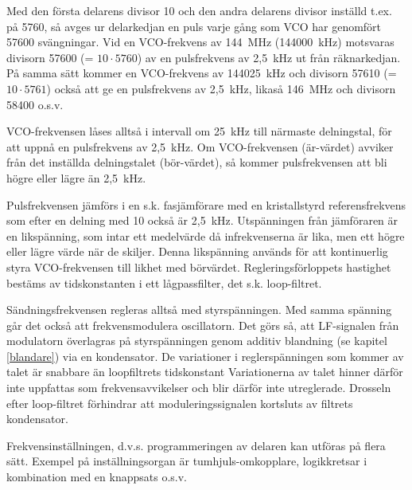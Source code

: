 Med den första delarens divisor 10 och den andra delarens divisor
inställd t.ex. på 5760, så avges ur delarkedjan en puls varje gång som
VCO har genomfört 57600 svängningar. Vid en VCO-frekvens av 144~MHz
(144000~kHz) motsvaras divisorn 57600 (= \(10 \cdot 5760\)) av en
pulsfrekvens av 2,5~kHz ut från räknarkedjan. På samma sätt kommer en
VCO-frekvens av 144025~kHz och divisorn 57610 (= \(10 \cdot 5761\))
också att ge en pulsfrekvens av 2,5~kHz, likaså 146~MHz och divisorn
58400 o.s.v.

VCO-frekvensen låses alltså i intervall om 25~kHz till närmaste
delningstal, för att uppnå en pulsfrekvens av 2,5~kHz. Om
VCO-frekvensen (är-värdet) avviker från det inställda delningstalet
(bör-värdet), så kommer pulsfrekvensen att bli högre eller lägre än
2,5~kHz.

Pulsfrekvensen jämförs i en s.k. fasjämförare med en kristallstyrd
referensfrekvens som efter en delning med 10 också är 2,5~kHz.
Utspänningen från jämföraren är en likspänning, som intar ett
medelvärde då infrekvenserna är lika, men ett högre eller lägre värde
när de skiljer. Denna likspänning används för att kontinuerlig styra
VCO-frekvensen till likhet med börvärdet. Regleringsförloppets
hastighet bestäms av tidskonstanten i ett lågpassfilter, det
s.k. loop-filtret.

Sändningsfrekvensen regleras alltså med styrspänningen. Med samma
spänning går det också att frekvensmodulera oscillatorn.  Det görs så,
att LF-signalen från modulatorn överlagras på styrspänningen genom
additiv blandning (se kapitel \ref{blandare}) via en kondensator. De
variationer i reglerspänningen som kommer av talet är snabbare än
loopfiltrets tidskonstant Variationerna av talet hinner därför inte
uppfattas som frekvensavvikelser och blir därför inte utreglerade.
Drosseln efter loop-filtret förhindrar att moduleringssignalen
kortsluts av filtrets kondensator.

Frekvensinställningen, d.v.s. programmeringen av delaren kan utföras
på flera sätt. Exempel på inställningsorgan är tumhjuls-omkopplare,
logikkretsar i kombination med en knappsats o.s.v.

